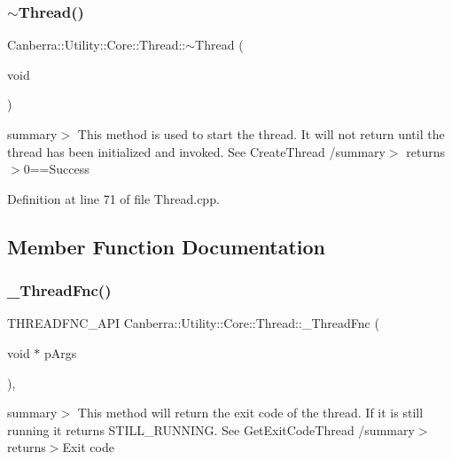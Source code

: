 \subsubsection{\texorpdfstring{$\sim$\+Thread()}{~Thread()}}
{\footnotesize\ttfamily Canberra\+::\+Utility\+::\+Core\+::\+Thread\+::$\sim$\+Thread (\begin{DoxyParamCaption}\item[{void}]{ }\end{DoxyParamCaption})\hspace{0.3cm}{\ttfamily [virtual]}}

summary$>$ This method is used to start the thread. It will not return until the thread has been initialized and invoked. See Create\+Thread /summary$>$ returns$>$0==Success

Definition at line 71 of file Thread.\+cpp.



\subsection{Member Function Documentation}
\mbox{\label{class_canberra_1_1_utility_1_1_core_1_1_thread_a04a1341b87d0e93138ca33b8f8b4447a_a04a1341b87d0e93138ca33b8f8b4447a}} 
\subsubsection{\texorpdfstring{\+\_\+\+Thread\+Fnc()}{\_ThreadFnc()}}
{\footnotesize\ttfamily T\+H\+R\+E\+A\+D\+F\+N\+C\+\_\+\+A\+PI Canberra\+::\+Utility\+::\+Core\+::\+Thread\+::\+\_\+\+Thread\+Fnc (\begin{DoxyParamCaption}\item[{void $\ast$}]{p\+Args }\end{DoxyParamCaption})\hspace{0.3cm}{\ttfamily [static]}, {\ttfamily [protected]}}

summary$>$ This method will return the exit code of the thread. If it is still running it returns S\+T\+I\+L\+L\+\_\+\+R\+U\+N\+N\+I\+NG. See Get\+Exit\+Code\+Thread /summary$>$ returns$>$Exit code

